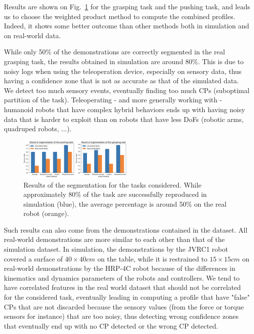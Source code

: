 \documentclass[conference]{IEEEtran}
\begin{document}
Results are shown on Fig.~\ref{fig:resultsSeg} for the grasping task and the pushing task, and leads us to choose the weighted product method to compute the combined profiles. Indeed, it shows some better outcome than other methods both in simulation and on real-world data. 

While only 50\% of the demonstrations are correctly segmented in the real grasping task, the results obtained in simulation are around 80\%. This is due to noisy logs when using the teleoperation device, especially on sensory data, thus having a confidence zone that is not as accurate as that of the simulated data. We detect too much sensory events, eventually finding too much CPs (suboptimal partition of the task). Teleoperating - and more generally working with - humanoid robots that have complex hybrid behaviors ends up with having noisy data that is harder to exploit than on robots that have less DoFs (robotic arms, quadruped robots, ...).

\begin{figure}[t]
  \centering
  \includegraphics[width=0.5\textwidth]{img/results_segmentation.png}
  \caption{Results of the segmentation for the tasks considered. While approximately 80\% of the task are successfully reproduced in simulation (blue), the average percentage is around 50\% on the real robot (orange).}
  \label{fig:resultsSeg}
\end{figure}

Such results can also come from the demonstrations contained in the dataset. All real-world demonstrations are more similar to each other than that of the simulation dataset. In simulation, the demonstrations by the JVRC1 robot covered a surface of $40 \times 40 cm$ on the table, while it is restrained to $15 \times 15 cm$ on real-world demonstrations by the HRP-4C robot because of the differences in kinematics and dynamics parameters of the robots and controllers. We tend to have correlated features in the real world dataset that should not be correlated for the considered task, eventually leading in computing a profile that have "false" CPs that are not discarded because the sensory values (from the force or torque sensors for instance) that are too noisy, thus detecting wrong confidence zones that eventually end up with no CP detected or the wrong CP detected.
\end{document}
